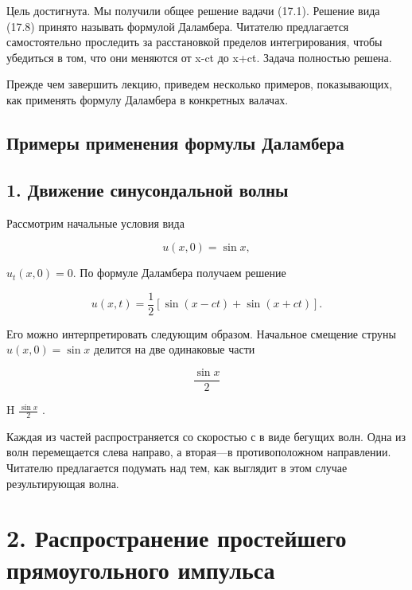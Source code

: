 \documentclass[
  ukrainian,
]{article}
\begin{document}
Цель достигнута. Мы получили общее решение вадачи (17.1). Решение вида
(17.8) принято называть формулой Даламбера. Читателю предлагается
самостоятельно проследить за расстановкой пределов интегрирования, чтобы
убедиться в том, что они меняются от x-ct до x+ct. Задача полностью
решена.

Прежде чем завершить лекцию, приведем несколько примеров, показывающих,
как применять формулу Даламбера в конкретных валачах.

\subsection{Примеры применения формулы
Даламбера}\label{ux43fux440ux438ux43cux435ux440ux44b-ux43fux440ux438ux43cux435ux43dux435ux43dux438ux44f-ux444ux43eux440ux43cux443ux43bux44b-ux434ux430ux43bux430ux43cux431ux435ux440ux430}

\subsection{1. Движение синусондальной
волны}\label{ux434ux432ux438ux436ux435ux43dux438ux435-ux441ux438ux43dux443ux441ux43eux43dux434ux430ux43bux44cux43dux43eux439-ux432ux43eux43bux43dux44b}

Рассмотрим начальные условия вида

\[
u(x, 0) = \sin x,
\]

\(u_t(x, 0) = 0.\) По формуле Даламбера получаем решение

\[
u(x, t) = \frac{1}{2} [\sin(x-ct) + \sin(x+ct)].
\]

Его можно интерпретировать следующим образом. Начальное смещение струны
\(u(x, 0) = \sin x\) делится на две одинаковые части

\[
\frac{\sin x}{2}
\]

H \(\frac{\sin x}{2}\) .

Каждая из частей распространяется со скоростью с в виде бегущих волн.
Одна из волн перемещается слева направо, а вторая---в противоположном
направлении. Читателю предлагается подумать над тем, как выглядит в этом
случае результирующая волна.

\section{2. Распространение простейшего прямоугольного
импульса}\label{ux440ux430ux441ux43fux440ux43eux441ux442ux440ux430ux43dux435ux43dux438ux435-ux43fux440ux43eux441ux442ux435ux439ux448ux435ux433ux43e-ux43fux440ux44fux43cux43eux443ux433ux43eux43bux44cux43dux43eux433ux43e-ux438ux43cux43fux443ux43bux44cux441ux430}
\end{document}
